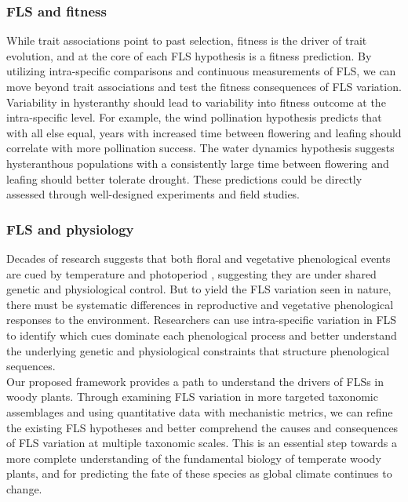\documentclass[12pt]{article}
\begin{document}
\subsubsection*{FLS and fitness}
\indent\indent While trait associations point to past selection, fitness is the driver of trait evolution, and at the core of each FLS hypothesis is a fitness prediction. By utilizing intra-specific comparisons and continuous measurements of FLS, we can move beyond trait associations and test the fitness consequences of FLS variation. \\
\indent Variability in hysteranthy should lead to variability into fitness outcome at the intra-specific level. For example, the wind pollination hypothesis predicts that with all else equal, years with increased time between flowering and leafing should correlate with more pollination success. The water dynamics hypothesis suggests hysteranthous populations with a consistently large time between flowering and leafing should better tolerate drought. These predictions could be directly assessed through well-designed experiments and field studies.\\
\subsubsection*{FLS and physiology} 
\indent\indent Decades of research suggests that both floral and vegetative phenological events are cued by temperature and photoperiod \citep{Forrest2010, Flynn2018}, suggesting they are under shared genetic and physiological control. But to yield the FLS variation seen in nature, there must be systematic differences in reproductive and vegetative phenological responses to the environment. Researchers can use intra-specific variation in FLS to identify which cues dominate each phenological process and better understand the underlying genetic and physiological constraints that structure phenological sequences.\\

\indent Our proposed framework provides a path to understand the drivers of FLSs in woody plants. Through examining FLS variation in more targeted taxonomic assemblages and using quantitative data with mechanistic metrics, we can refine the existing FLS hypotheses and better comprehend the causes and consequences of FLS variation at multiple taxonomic scales. This is an essential step towards a more complete understanding of the fundamental biology of temperate woody plants, and for predicting the fate of these species as global climate continues to change.
\end{document}
